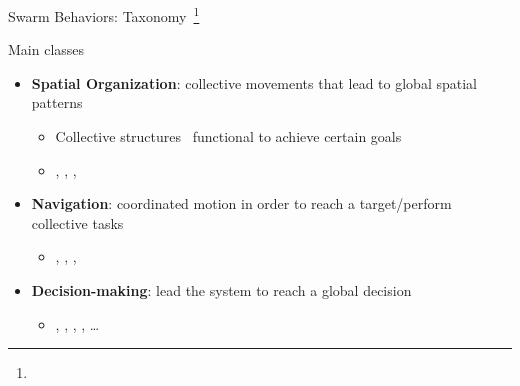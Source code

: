 \documentclass[presentation, 9pt]{beamer}\mode<presentation>{\usetheme{AMSBolognaFC}}
\begin{document}
\begin{frame}{Swarm Behaviors: Taxonomy~\footnote{}}
\begin{exampleblock}{Main classes}
	\begin{itemize}
		\item \textbf{Spatial Organization}: collective movements that lead to global spatial patterns
		\begin{itemize}
			\item Collective structures \faArrowRight \, functional to achieve certain goals
			\item {}, , ,  
		\end{itemize}
		\item \textbf{Navigation}: coordinated motion in order to reach a target/perform collective tasks
		\begin{itemize}
			\item {}, , , 
		\end{itemize}
		\item \textbf{Decision-making}: lead the system to reach a global decision %
		\begin{itemize}
			\item {}, , , , \dots
		\end{itemize}
	\end{itemize}
\end{exampleblock}


\end{frame}
\end{document}
